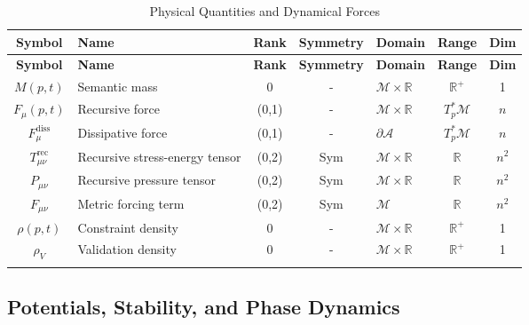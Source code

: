 {\small
\renewcommand{\arraystretch}{1.1}
\begin{longtable}{|c|p{5.5cm}|c|c|p{1.8cm}|c|c|}
\hline
\textbf{Symbol} & \textbf{Name} & \textbf{Rank} & \textbf{Symmetry} & \textbf{Domain} & \textbf{Range} & \textbf{Dim} \\
\hline
\endfirsthead
\hline
\textbf{Symbol} & \textbf{Name} & \textbf{Rank} & \textbf{Symmetry} & \textbf{Domain} & \textbf{Range} & \textbf{Dim} \\
\hline
\endhead
\(M(p,t)\) & Semantic mass & 0 & - & \(\mathcal{M} \times \mathbb{R}\) & \(\mathbb{R}^+\) & 1 \\
\hline
\(F_\mu(p,t)\) & Recursive force & (0,1) & - & \(\mathcal{M} \times \mathbb{R}\) & \(T_p^*\mathcal{M}\) & \(n\) \\
\hline
\(F_\mu^{\text{diss}}\) & Dissipative force & (0,1) & - & \(\partial\mathcal{A}\) & \(T_p^*\mathcal{M}\) & \(n\) \\
\hline
\(T_{\mu\nu}^{\text{rec}}\) & Recursive stress-energy tensor & (0,2) & Sym & \(\mathcal{M} \times \mathbb{R}\) & \(\mathbb{R}\) & \(n^2\) \\
\hline
\(P_{\mu\nu}\) & Recursive pressure tensor & (0,2) & Sym & \(\mathcal{M} \times \mathbb{R}\) & \(\mathbb{R}\) & \(n^2\) \\
\hline
\(F_{\mu\nu}\) & Metric forcing term & (0,2) & Sym & \(\mathcal{M}\) & \(\mathbb{R}\) & \(n^2\) \\
\hline
\(\rho(p,t)\) & Constraint density & 0 & - & \(\mathcal{M} \times \mathbb{R}\) & \(\mathbb{R}^+\) & 1 \\
\hline
\(\rho_V\) & Validation density & 0 & - & \(\mathcal{M} \times \mathbb{R}\) & \(\mathbb{R}^+\) & 1 \\
\hline
\caption{Physical Quantities and Dynamical Forces}
\end{longtable}
}


\subsection{Potentials, Stability, and Phase Dynamics}
\label{2.2.5:potentials_stability_and_phase_dynamics}

